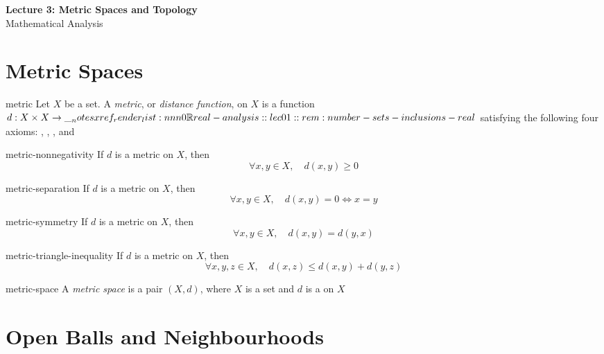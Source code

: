 \documentclass[12pt]{article}
\begin{document}
\begin{center}
  {\LARGE\bfseries Lecture 3: Metric Spaces and Topology}\\[0.25em]
  {\large Mathematical Analysis}\\[0.15em]
\end{center}

\section{Metric Spaces}

\begin{dfn}[Metric]{metric}
  Let \(X\) be a set. A \emph{metric}, or \emph{distance function}, on
  \(X\) is a function \(d:X\times X\to\RR\) satisfying the following
  four axioms:
  ,
  ,
  , and
\end{dfn}

\begin{axm}[Nonnegativity]{metric-nonnegativity}
  If \(d\) is a metric on \(X\), then
  \[
    \forall x,y\in X,\quad d(x,y)\geq0
  \]
\end{axm}

\begin{axm}{metric-separation}
  If \(d\) is a metric on \(X\), then
  \[
    \forall x,y\in X,\quad d(x,y)=0\iff x=y
  \]
\end{axm}

\begin{axm}[Symmetry]{metric-symmetry}
  If \(d\) is a metric on \(X\), then
  \[
    \forall x,y\in X,\quad d(x,y)=d(y,x)
  \]
\end{axm}

\begin{axm}{metric-triangle-inequality}
  If \(d\) is a metric on \(X\), then
  \[
    \forall x,y,z\in X,\quad d(x,z)\leq d(x,y)+d(y,z)
  \]
\end{axm}

\begin{dfn}{metric-space}
  A \emph{metric space} is a pair \((X,d)\), where \(X\) is a set and
  \(d\) is a  on \(X\)
\end{dfn}

\section{Open Balls and Neighbourhoods}
\end{document}
